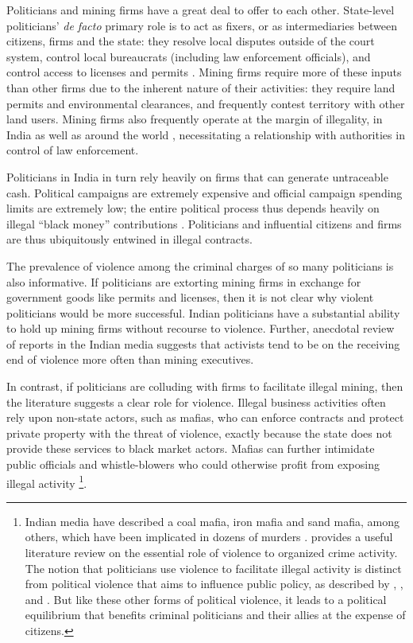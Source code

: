 \documentclass[12pt,letterpaper]{article}
\begin{document}
Politicians and mining firms have a great deal to offer to each other.
State-level politicians' \textit{de facto} primary role is to act as
fixers, or as intermediaries between citizens, firms and the state:
they resolve local disputes outside of the court system, control local
bureaucrats (including law enforcement officials), and control access
to licenses and permits
\cite{Jensenius2013a,Iyer2012a,an2017pols}. Mining firms require more
of these inputs than other firms due to the inherent nature of their
activities: they require land permits and environmental clearances,
and frequently contest territory with other land users. Mining firms
also frequently operate at the margin of illegality, in India as well
as around the world \cite{Africapp2013}, necessitating a relationship
with authorities in control of law enforcement.

Politicians in India in turn rely heavily on firms that can generate
untraceable cash. Political campaigns are extremely expensive and
official campaign spending limits are extremely low; the entire
political process thus depends heavily on illegal ``black money''
contributions \cite{Vaishnav2017,Chauchard2018}. Politicians and
influential citizens and firms are thus ubiquitously entwined in
illegal contracts.

The prevalence of violence among the criminal charges of so many
politicians is also informative.  If politicians are extorting mining
firms in exchange for government goods like permits and licenses, then
it is not clear why violent politicians would be more successful.
Indian politicians have a substantial ability to hold up mining firms
without recourse to violence. Further, anecdotal review of reports in
the Indian media suggests that activists tend to be on the receiving
end of violence more often than mining executives.

In contrast, if politicians are colluding with firms to facilitate
illegal mining, then the literature suggests a clear role for
violence.  Illegal business activities often rely upon non-state
actors, such as mafias, who can enforce contracts and protect private
property with the threat of violence, exactly because the state does
not provide these services to black market actors. Mafias can
further intimidate public officials and whistle-blowers who could
otherwise profit from exposing illegal activity
\cite{Gambetta1996,Bandiera2003,Chimeli2011}\footnote{Indian media
  have described a coal mafia, iron mafia and sand mafia, among
  others, which have been implicated in dozens of murders
  \cite{Bhowmick2011,Paul2015}.  provides a
  useful literature review on the essential role of violence to
  organized crime activity. The notion that politicians use
  violence to facilitate illegal activity is distinct from political
  violence that aims to influence public policy, as described by
  , , and
  . But like these other forms of political
  violence, it leads to a political equilibrium that benefits criminal
  politicians and their allies at the expense of citizens.}.
\end{document}
